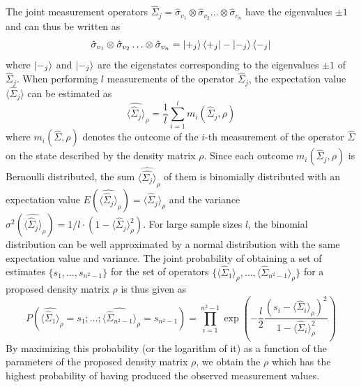 The joint measurement operators $\hat{\Sigma}_j = \hat{\sigma}_{v_1}\otimes \hat{\sigma}_{v_2}\hdots \otimes\hat{\sigma}_{v_n}$ have the eigenvalues $\pm 1$ and can thus be written as 
\begin{equation}
\hat{\sigma}_{v_1}\otimes \hat{\sigma}_{v_2}\hdots \otimes\hat{\sigma}_{v_n} = \left| +_j \right>\left< +_j \right|-\left| -_j \right>\left< -_j \right| \label{eq:ml_operators}
\end{equation}
where $\left| -_j \right>$ and $\left| -_j \right>$ are the eigenstates corresponding to the eigenvalues $\pm 1$ of $\hat{\Sigma}_j$. When performing $l$ measurements of the operator $\hat{\Sigma}_j$, the expectation value $\langle \hat{\Sigma}_j \rangle$ can be estimated as
%
\begin{equation}
\widehat{\langle \hat{\Sigma}_j \rangle}_\rho = \frac{1}{l}\sum\limits_{i = 1}^l m_i(\hat{\Sigma}_j,\rho) \label{eq:tomography_measurement_estimator}
\end{equation}
where $m_i(\hat{\Sigma},\rho)$ denotes the outcome of the $i$-th measurement of the operator $\hat{\Sigma}$ on the state described by the density matrix $\rho$. Since each outcome $m_i(\hat{\Sigma}_j,\rho)$ is Bernoulli distributed, the sum $\widehat{\langle\hat{\Sigma_j}\rangle}_\rho$ of them is binomially distributed with an expectation value \mbox{$E(\widehat{\langle \hat{\Sigma}_j \rangle}_\rho) = \langle \hat{\Sigma}_j \rangle_\rho$} and the variance $\sigma^2(\widehat{\langle \hat{\Sigma}_j \rangle}_\rho) = 1/l \cdot (1-\langle \hat{\Sigma}_j \rangle_\rho^2)$. For large sample sizes $l$, the binomial distribution can be well approximated by a normal distribution with the same expectation value and variance. The joint probability of obtaining a set of estimates $\{s_1,\hdots,s_{n^2-1}\}$ for the set of operators $\{\langle\hat{\Sigma}_1 \rangle_\rho,\hdots,\langle\hat{\Sigma}_{n^2-1} \rangle_\rho\}$ for a proposed density matrix $\rho$ is thus given as
%
\begin{equation}
P\left(\widehat{\langle \hat{\Sigma}_1 \rangle }_\rho = s_1;\hdots;\widehat{\langle \hat{\Sigma}_{n^2-1} \rangle}_\rho =  s_{n^2-1}\right) = \prod\limits_{i = 1}^{n^2-1} \exp{\left(-\frac{l}{2}\frac{(s_i-\langle \hat{\Sigma}_i \rangle_\rho)^2}{1-\langle \hat{\Sigma}_i \rangle_\rho^2}\right)}
\end{equation}
%
By maximizing this probability (or the logarithm of it) as a function of the parameters of the proposed density matrix $\rho$, we obtain the $\rho$ which has the highest probability of having produced the observed measurement values. 

